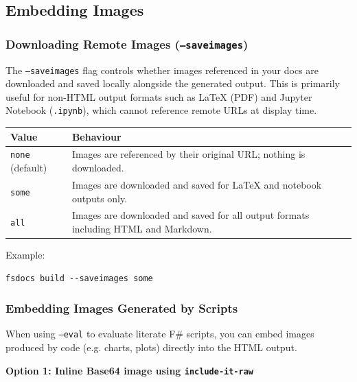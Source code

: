 \documentclass{article}
\begin{document}
\subsection*{Embedding Images}

\subsubsection*{Downloading Remote Images (\texttt{--saveimages})}



The \texttt{--saveimages} flag controls whether images referenced in your docs are downloaded and saved locally alongside the generated output. This is primarily useful for non-HTML output formats such as LaTeX (PDF) and Jupyter Notebook (\texttt{.ipynb}), which cannot reference remote URLs at display time.
\begin{tabular}{|l|l|}\hline
\textbf{Value} & \textbf{Behaviour}\\ \hline\hline
\texttt{none} (default) & Images are referenced by their original URL; nothing is downloaded.\\ \hline
\texttt{some} & Images are downloaded and saved for LaTeX and notebook outputs only.\\ \hline
\texttt{all} & Images are downloaded and saved for all output formats including HTML and Markdown.\\ \hline
\end{tabular}



Example:
\begin{lstlisting}
fsdocs build --saveimages some

\end{lstlisting}
\subsubsection*{Embedding Images Generated by Scripts}



When using \texttt{--eval} to evaluate literate F\# scripts, you can embed images produced by code (e.g. charts, plots) directly into the HTML output.


\textbf{Option 1: Inline Base64 image using \texttt{include-it-raw}}
\end{document}
